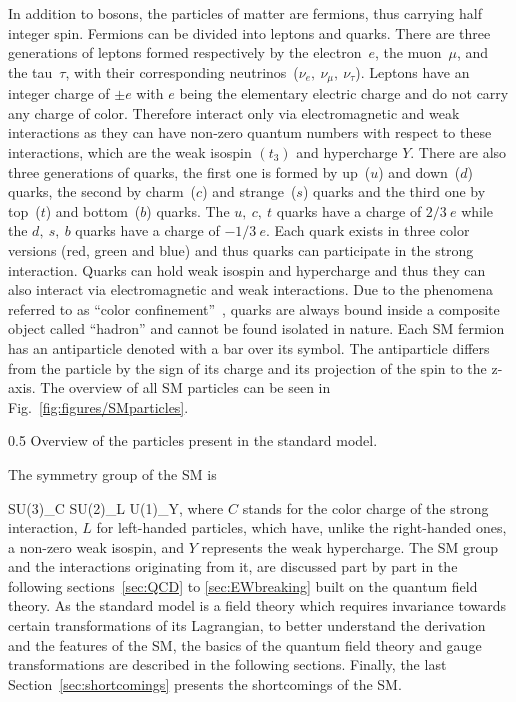 In addition  to bosons, the particles of matter are fermions, thus carrying half integer spin. Fermions can be divided into leptons and quarks. There are three generations of leptons formed respectively by the electron~$e$, the muon~$\mu$, and the tau~$\tau$, with their corresponding neutrinos~($\nu_{e},~\nu_{\mu},~\nu_{\tau}$). Leptons have an integer charge of $\pm e$ with $e$ being the elementary electric charge and do not carry any charge of color. Therefore interact only via electromagnetic and weak interactions as they can have non-zero quantum numbers with respect to these interactions, which are the weak isospin $(t_{3})$ and hypercharge $Y$. There are also three generations of quarks, the first one is formed by up~($u$) and down~($d$) quarks, the second by charm~($c$) and strange~($s$) quarks and the third one by top~($t$) and bottom~($b$) quarks. The $u,~c,~t$ quarks have a charge of $2/3~e$ while the $d,~s,~b$ quarks have a charge of $-1/3~e$. Each quark exists in three color versions (red, green and blue) and thus quarks can participate in the strong interaction. Quarks can hold weak isospin and hypercharge and thus they can also interact via electromagnetic and weak interactions. Due to the phenomena referred to as ``color confinement''~\cite{Alkofer:2006fu}, quarks are always bound inside a composite object called ``hadron'' and cannot be found isolated in nature. Each SM fermion has an antiparticle denoted with a bar over its symbol. The antiparticle differs from the particle by the sign of its charge and its projection of the spin to the z-axis. The overview of all SM particles can be seen in Fig.~\ref{fig:figures/SMparticles}.



                 {0.5}       %
                 { Overview of the particles present in the standard model.}

The symmetry group of the SM is

{
SU(3)_{C} \otimes SU(2)_{L} \otimes U(1)_{Y},
}
where $C$ stands for the color charge of the strong interaction, $L$ for left-handed particles, which have, unlike the right-handed ones, a non-zero weak isospin, and $Y$ represents the weak hypercharge. The SM group and the interactions originating from it, are discussed part by part in the following sections~\ref{sec:QCD} to \ref{sec:EWbreaking} built on the quantum field theory. As the standard model is a field theory which requires invariance towards certain transformations of its Lagrangian, to better understand the derivation and the features of the SM, the basics of the quantum field theory and gauge transformations are described in the following sections. Finally, the last Section~\ref{sec:shortcomings} presents the shortcomings of the SM.






